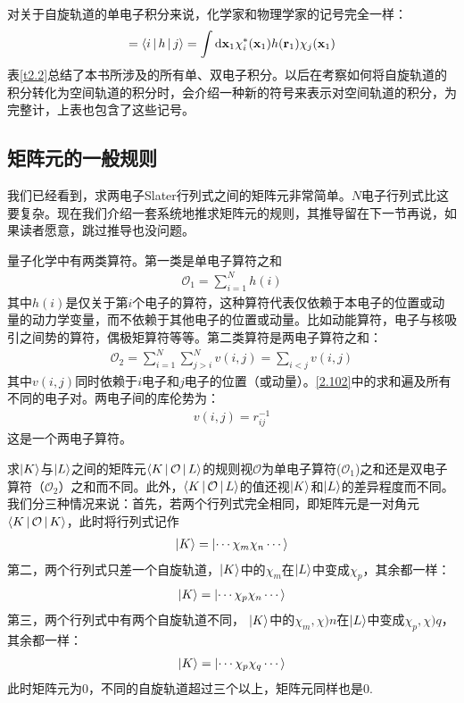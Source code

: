 对关于自旋轨道的单电子积分来说，化学家和物理学家的记号完全一样：
\begin{align}
[i|h|j]=\braket{i|h|j}=\int\ddx_1\chi_i^*(\bo{x}_1)h(\bo{r}_1)\chi_j(\bo{x}_1)
\end{align}
表\ref{t2.2}总结了本书所涉及的所有单、双电子积分。以后在考察如何将自旋轨道的积分转化为空间轨道的积分时，会介绍一种新的符号来表示对空间轨道的积分，为完整计，上表也包含了这些记号。


\subsection{矩阵元的一般规则}
\label{sec2.3.3}
我们已经看到，求两电子Slater行列式之间的矩阵元非常简单。$N$电子行列式比这要复杂。现在我们介绍一套系统地推求矩阵元的规则，其推导留在下一节再说，如果读者愿意，跳过推导也没问题。

量子化学中有两类算符。第一类是单电子算符之和
\begin{align}
\mathcal{O}_1=\sum_{i=1}^N h(i)
\end{align}
其中$h(i)$是仅关于第$i$个电子的算符，这种算符代表仅依赖于本电子的位置或动量的动力学变量，而不依赖于其他电子的位置或动量。比如动能算符，电子与核吸引之间势的算符，偶极矩算符等等。第二类算符是两电子算符之和：
\begin{align}
\label{2.102}
\mathcal{O}_2 = \sum_{i=1}^{N}\sum_{j>i}^N v(i,j)=\sum_{i<j}v(i,j)
\end{align}
其中$v(i,j)$同时依赖于$i$电子和$j$电子的位置（或动量）。\ref{2.102}中的求和遍及所有不同的电子对。两电子间的库伦势为：
\begin{align}
v(i,j)=r_{ij}^{-1}
\end{align}
这是一个两电子算符。

求$\Ket{K}$与$\Ket{L}$之间的矩阵元$\Braket{K|\mathcal{O}|L}$的规则视$\mathcal{O}$为单电子算符($\mathcal{O}_1$)之和还是双电子算符（$\mathcal{O}_2$）之和而不同。此外，$\Braket{K|\mathcal{O}|L}$的值还视$\Ket{K}$和$\Ket{L}$的差异程度而不同。我们分三种情况来说：首先，若两个行列式完全相同，即矩阵元是一对角元$\Braket{K|\mathcal{O}|K}$，此时将行列式记作
\begin{align}
\Ket{K}=\Ket{\cdots\chi_m\chi_n\cdots}
\end{align}
第二，两个行列式只差一个自旋轨道，$\Ket{K}$中的$\chi_m$在$\Ket{L}$中变成$\chi_p$，其余都一样：
\begin{align}
\Ket{K}=\Ket{\cdots\chi_p\chi_n\cdots}
\end{align}
第三，两个行列式中有两个自旋轨道不同，
$\Ket{K}$中的$\chi_m,\chi)n$在$\Ket{L}$中变成$\chi_p,\chi)q$，其余都一样：
\begin{align}
\Ket{K}=\Ket{\cdots\chi_p\chi_q\cdots}
\end{align}
此时矩阵元为0，不同的自旋轨道超过三个以上，矩阵元同样也是0.

